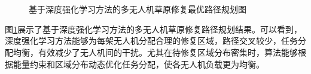 \documentclass[AutoFakeBold]{LZUThesis}
\begin{document}
\begin{figure}[H]
	\centering
	\subfloat[60点500边长4机]{\label{fig:DRL_60_500_4}}
	\subfloat[60点500边长6机]{\label{fig:DRL_60_500_6}} 
	\subfloat[60点500边长8机]{\label{fig:DRL_60_500_8}}\\
	\subfloat[60点600边长4机]{\label{fig:DRL_60_600_4}}
	\subfloat[60点600边长6机]{\label{fig:DRL_60_600_6}}
	\subfloat[60点600边长8机]{\label{fig:DRL_60_600_8}}\\
	\subfloat[60点700边长4机]{\label{fig:DRL_60_700_4}}
	\subfloat[60点700边长6机]{\label{fig:DRL_60_700_6}}
	\subfloat[60点700边长8机]{\label{fig:DRL_60_700_8}}
	\caption{基于深度强化学习方法的多无人机草原修复最优路径规划图}
	\label{fig:RL_combined_uav_routes}
\end{figure}
图\ref{fig:RL_combined_uav_routes}展示了基于深度强化学习方法的多无人机草原修复路径规划结果。可以看到，深度强化学习方法能够为每架无人机分配合理的修复区域，路径交叉较少，任务分配均衡，有效减少了无人机间的干扰。尤其在待修复区域分布密集时，算法能够根据能量约束和区域分布动态优化任务分配，使各无人机负载更为均衡。
\end{document}
